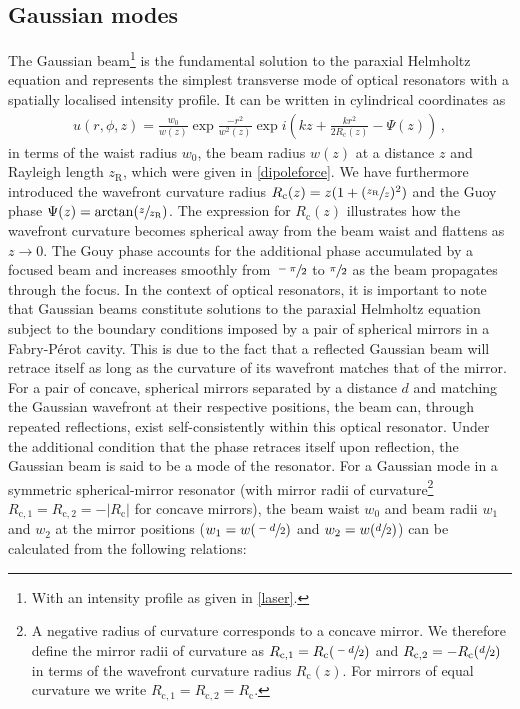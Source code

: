 \documentclass[../Thesis-IJspeert.tex]{subfiles}
\begin{document}
\subsection{Gaussian modes}
The Gaussian beam\footnote{With an intensity profile as given in \autoref{laser}.} is the fundamental solution to the paraxial Helmholtz equation and represents the simplest transverse mode of optical resonators with a spatially localised intensity profile. It can be written in cylindrical coordinates as \cite{Saleh1991}
\begin{align}
\label{gaussianmode}
u(r, \phi, z) = \frac{w_0}{w(z)}\exp{\frac{-r^2}{w^2(z)}}\exp{i\left( kz + \frac{kr^2}{2R_\mathrm{c}(z)} - \Psi(z)\right)}\,,
\end{align}
in terms of the waist radius $w_0$, the beam radius $w(z)$ at a distance $z$ and Rayleigh length $z_\mathrm{R}$, which were given in \autoref{dipoleforce}. We have furthermore introduced the wavefront curvature radius $R_\mathrm{c}(z)=z(1+(\sfrac{z_\mathrm{R}}{z})^2)$ and the Guoy phase $\Psi(z)=\arctan\left(\sfrac{z}{z_\mathrm{R}}\right)$. The expression for $R_\mathrm{c}(z)$ illustrates how the wavefront curvature becomes spherical away from the beam waist and flattens as $z \to 0$. The Gouy phase accounts for the additional phase accumulated by a focused beam and increases smoothly from $\sfrac{-\pi}{2}$ to $\sfrac{\pi}{2}$ as the beam propagates through the focus. In the context of optical resonators, it is important to note that Gaussian beams constitute solutions to the paraxial Helmholtz equation subject to the boundary conditions imposed by a pair of spherical mirrors in a Fabry-Pérot cavity. This is due to the fact that a reflected Gaussian beam will retrace itself as long as the curvature of its wavefront matches that of the mirror. For a pair of concave, spherical mirrors separated by a distance $d$ and matching the Gaussian wavefront at their respective positions, the beam can, through repeated reflections, exist self-consistently within this optical resonator. Under the additional condition that the phase retraces itself upon reflection, the Gaussian beam is said to be a mode of the resonator. For a Gaussian mode in a symmetric spherical-mirror resonator (with mirror radii of curvature\footnote{A negative radius of curvature corresponds to a concave mirror. We therefore define the mirror radii of curvature as $R_{\mathrm{c},1}=R_\mathrm{c}(\sfrac{-d}{2})$ and $R_{\mathrm{c},2}=-R_\mathrm{c}(\sfrac{d}{2})$ in terms of the wavefront curvature radius $R_\mathrm{c}(z)$. For mirrors of equal curvature we write $R_{\mathrm{c},1}=R_{\mathrm{c},2}= R_\mathrm{c}$.} $R_{\mathrm{c},1}=R_{\mathrm{c},2}=-\lvert R_\mathrm{c} \rvert$ for concave mirrors), the beam waist $w_0$ and beam radii $w_1$ and $w_2$ at the mirror positions ($w_1=w(\sfrac{-d}{2})$ and $w_2=w(\sfrac{d}{2})$) can be calculated from the following relations:
\end{document}
